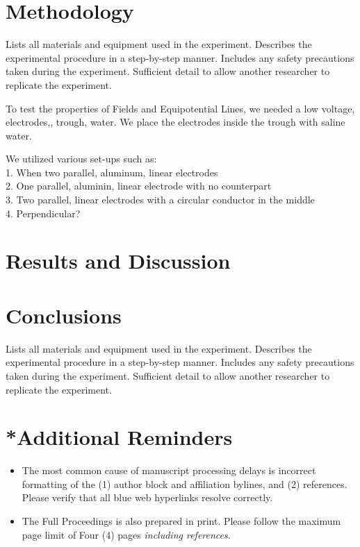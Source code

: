 \documentclass[10pt,a4paper,twoside]{article}
\begin{document}
\section{Methodology}\label{sec:methods}
Lists all materials and equipment used in the experiment.
Describes the experimental procedure in a step-by-step manner.
Includes any safety precautions taken during the experiment.
Sufficient detail to allow another researcher to replicate the experiment.

To test the properties of Fields and Equipotential Lines, we needed a low voltage, electrodes,, trough, water. We place the electrodes inside the trough
with saline water. 

We utilized various set-ups such as:\\
1. When two parallel, aluminum, linear electrodes\\
2. One parallel, aluminin, linear electrode with no counterpart\\
3. Two parallel, linear electrodes with a circular conductor in the middle\\
4. Perpendicular?


\section{Results and Discussion}\label{sec:results}


\section{Conclusions}\label{sec:conclusions}
Lists all materials and equipment used in the experiment.
Describes the experimental procedure in a step-by-step manner.
Includes any safety precautions taken during the experiment.
Sufficient detail to allow another researcher to replicate the experiment.

\section*{*Additional Reminders}
\begin{itemize}
    \item The most common cause of manuscript processing delays is incorrect formatting of the (1) author block and affiliation bylines, and (2) references. Please verify that all blue web hyperlinks resolve correctly.
    \item The Full Proceedings is also prepared in print. Please follow the maximum page limit of Four (4) pages \textit{including references}. 
\end{itemize}



\end{document}

